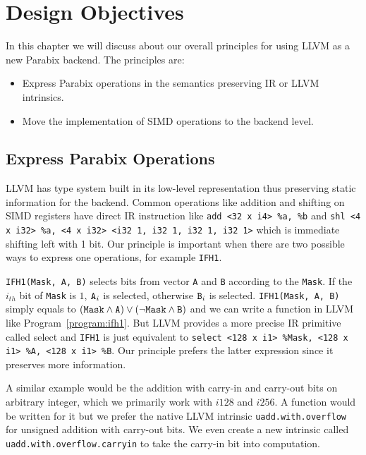 %
%

\chapter{Design Objectives}
\label{three}

In this chapter we will discuss about our overall principles for using LLVM as a new Parabix backend. The principles are:

\begin{itemize}
    \item Express Parabix operations in the semantics preserving IR or LLVM intrinsics.
    \item Move the implementation of SIMD operations to the backend level.
\end{itemize}

\section{Express Parabix Operations}

LLVM has type system built in its low-level representation thus preserving static information for the backend. Common operations like addition and shifting on SIMD registers have direct IR instruction like \verb|add <32 x i4> %a, %b| and \verb|shl <4 x i32> %a, <4 x i32> <i32 1, i32 1, i32 1, i32 1>| which is immediate shifting left with 1 bit. Our principle is important when there are two possible ways to express one operations, for example {\tt IFH1}.

{\tt IFH1(Mask, A, B)} selects bits from vector {\tt A} and {\tt B} according to the {\tt Mask}. If the $i_{th}$ bit of {\tt Mask} is $1$, $\text{\tt A}_i$ is selected, otherwise $\text{\tt B}_i$ is selected. {\tt IFH1(Mask, A, B)} simply equals to $(\text{\tt Mask} \land \text{\tt A}) \lor (\lnot \text{\tt Mask} \land \text{\tt B})$ and we can write a function in LLVM like Program~\ref{program:ifh1}. But LLVM provides a more precise IR primitive called select and {\tt IFH1} is just equivalent to {\tt select <128 x i1> \%Mask, <128 x i1> \%A, <128 x i1> \%B}. Our principle prefers the latter expression since it preserves more information.

A similar example would be the addition with carry-in and carry-out bits on arbitrary integer, which we primarily work with $i128$ and $i256$. A function would be written for it but we prefer the native LLVM intrinsic {\tt uadd.with.overflow} for unsigned addition with carry-out bits. We even create a new intrinsic called {\tt uadd.with.overflow.carryin} to take the carry-in bit into computation.

